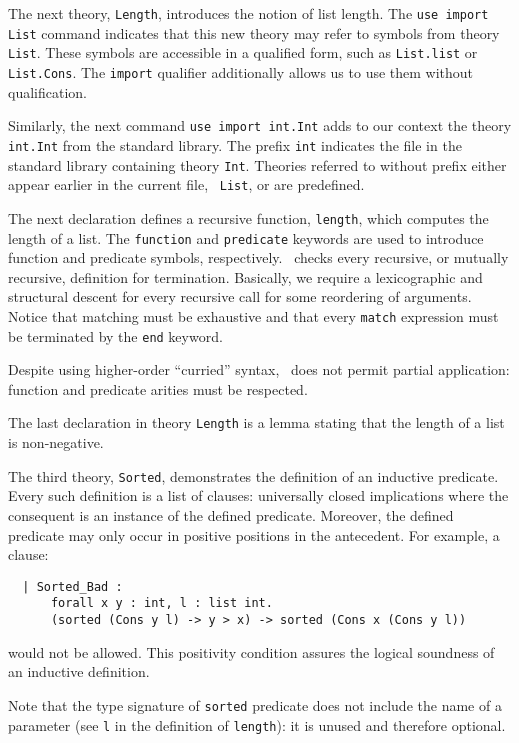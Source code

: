 The next theory, \texttt{Length}, introduces the notion of list
length. The \texttt{use import List} command indicates that this new
theory may refer to symbols from theory \texttt{List}. These symbols
are accessible in a qualified form, such as \texttt{List.list} or
\texttt{List.Cons}. The \texttt{import} qualifier additionally allows
us to use them without qualification.

Similarly, the next command \texttt{use import int.Int} adds to our
context the theory \texttt{int.Int} from the standard library. The
prefix \texttt{int} indicates the file in the standard library
containing theory \texttt{Int}. Theories referred to without prefix
either appear earlier in the current file, \eg\ \texttt{List}, or are
predefined.

The next declaration defines a recursive function, \texttt{length},
which computes the length of a list. The \texttt{function} and
\texttt{predicate} keywords are used to introduce function and
predicate symbols, respectively.
\why\ checks every recursive, or mutually recursive, definition for
termination. Basically, we require a lexicographic and structural
descent for every recursive call for some reordering of arguments.
Notice that matching must be exhaustive and that every \texttt{match}
expression must be terminated by the \texttt{end} keyword.

Despite using higher-order ``curried'' syntax, \why\ does not permit
partial application: function and predicate arities must be respected.

The last declaration in theory \texttt{Length} is a lemma stating that
the length of a list is non-negative.

The third theory, \texttt{Sorted}, demonstrates the definition of
an inductive predicate. Every such definition is a list of clauses:
universally closed implications where the consequent is an instance
of the defined predicate. Moreover, the defined predicate may only
occur in positive positions in the antecedent. For example, a clause:
\begin{verbatim}
  | Sorted_Bad :
      forall x y : int, l : list int.
      (sorted (Cons y l) -> y > x) -> sorted (Cons x (Cons y l))
\end{verbatim}
would not be allowed. This positivity condition assures the logical
soundness of an inductive definition.

Note that the type signature of \texttt{sorted} predicate does not
include the name of a parameter (see \texttt{l} in the definition
of \texttt{length}): it is unused and therefore optional.

